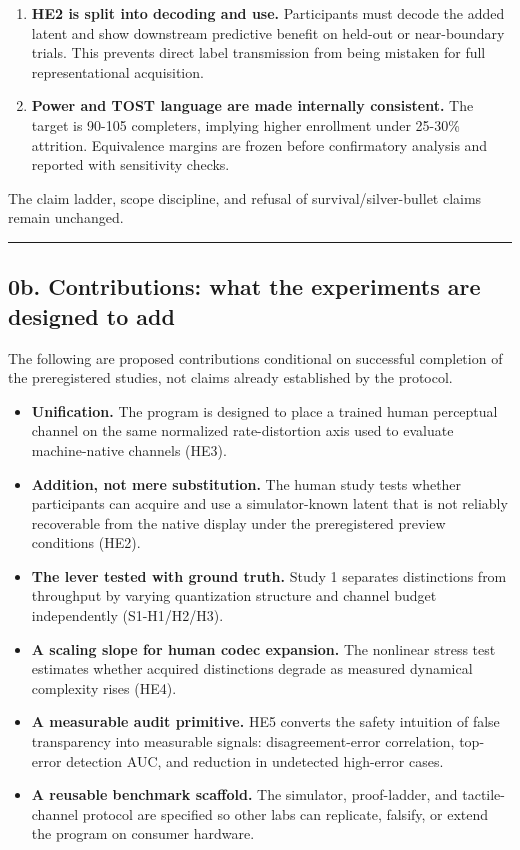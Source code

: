 \documentclass[
  11pt,
]{article}
\providecommand{\tightlist}{%
  \setlength{\itemsep}{0pt}\setlength{\parskip}{0pt}}
\begin{document}
\begin{enumerate}
  informative S5 and S7 failures. It is not
  reported as confirmatory evidence.
\item
  \textbf{HE2 is split into decoding and use.}
  Participants must decode the added latent and
  show downstream predictive benefit on held-out
  or near-boundary trials. This prevents direct
  label transmission from being mistaken for
  full representational acquisition.
\item
  \textbf{Power and TOST language are made
  internally consistent.} The target is 90-105
  completers, implying higher enrollment under
  25-30\% attrition. Equivalence margins are
  frozen before confirmatory analysis and
  reported with sensitivity checks.
\end{enumerate}

The claim ladder, scope discipline, and refusal
of survival/silver-bullet claims remain
unchanged.

\begin{center}\rule{0.5\linewidth}{0.5pt}\end{center}

\subsection{0b. Contributions: what the
experiments are designed to
add}\label{b.-contributions-what-the-experiments-are-designed-to-add}

The following are proposed contributions
conditional on successful completion of the
preregistered studies, not claims already
established by the protocol.

\begin{itemize}
\tightlist
\item
  \textbf{Unification.} The program is designed
  to place a trained human perceptual channel on
  the same normalized rate-distortion axis used
  to evaluate machine-native channels (HE3).
\item
  \textbf{Addition, not mere substitution.} The
  human study tests whether participants can
  acquire and use a simulator-known latent that
  is not reliably recoverable from the native
  display under the preregistered preview
  conditions (HE2).
\item
  \textbf{The lever tested with ground truth.}
  Study 1 separates distinctions from throughput
  by varying quantization structure and channel
  budget independently (S1-H1/H2/H3).
\item
  \textbf{A scaling slope for human codec
  expansion.} The nonlinear stress test
  estimates whether acquired distinctions
  degrade as measured dynamical complexity rises
  (HE4).
\item
  \textbf{A measurable audit primitive.} HE5
  converts the safety intuition of false
  transparency into measurable signals:
  disagreement-error correlation, top-error
  detection AUC, and reduction in undetected
  high-error cases.
\item
  \textbf{A reusable benchmark scaffold.} The
  simulator, proof-ladder, and tactile-channel
  protocol are specified so other labs can
  replicate, falsify, or extend the program on
  consumer hardware.
\end{itemize}
\end{document}
